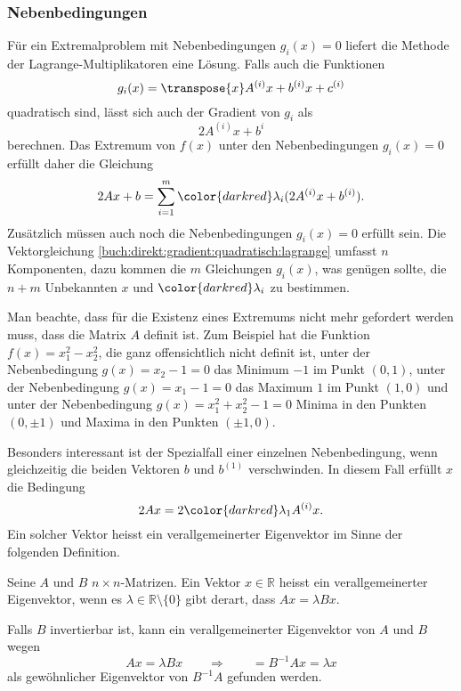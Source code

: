 %
%
\subsubsection{Nebenbedingungen}
Für ein Extremalproblem mit Nebenbedingungen $g_i(x)=0$ liefert die
Methode der Lagrange-Multiplikatoren eine Lösung.
Falls auch die Funktionen
\[
g_i(x)
=
\transpose{x}A^{(i)}x + b^{(i)}x + c^{(i)}
\]
quadratisch sind, lässt sich auch der Gradient von $g_i$ als
\[
2A^{(i)}x + b^{i}
\]
berechnen.
Das Extremum von $f(x)$ unter den Nebenbedingungen $g_i(x)=0$ erfüllt
daher die Gleichung
\begin{equation}
2Ax + b
=
\sum_{i=1}^m {\color{darkred}\lambda_i} (2A^{(i)}x+b^{(i)}).
\label{buch:direkt:gradient:quadratisch:lagrange}
\end{equation}
Zusätzlich müssen auch noch die Nebenbedingungen $g_i(x)=0$ erfüllt sein.
Die Vektorgleichung \eqref{buch:direkt:gradient:quadratisch:lagrange}
umfasst $n$ Komponenten, dazu kommen die $m$ Gleichungen $g_i(x)$,
was genügen sollte, die $n+m$ Unbekannten $x$ und ${\color{darkred}\lambda_i}$
zu bestimmen.

Man beachte, dass für die Existenz eines Extremums nicht mehr gefordert
werden muss, dass die Matrix $A$ definit ist.
Zum Beispiel hat die Funktion $f(x) = x_1^2 - x_2^2$, die ganz offensichtlich
nicht definit ist,
unter der Nebenbedingung $g(x)=x_2-1=0$ das Minimum $-1$ im Punkt $(0,1)$,
unter der Nebenbedingung $g(x)=x_1-1=0$ das Maximum $1$ im Punkt $(1,0)$ und
unter der Nebenbedingung $g(x)=x_1^2+x_2^2-1=0$ Minima in den Punkten
$(0,\pm1)$ und Maxima in den Punkten $(\pm1,0)$.

Besonders interessant ist der Spezialfall einer einzelnen Nebenbedingung,
wenn gleichzeitig die beiden Vektoren $b$ und $b^{(1)}$ verschwinden.
In diesem Fall erfüllt $x$ die Bedingung
\[
2Ax=2{\color{darkred}\lambda_1}A^{(i)}x.
\]
Ein solcher Vektor heisst ein verallgemeinerter Eigenvektor im Sinne
der folgenden Definition.

\begin{definition}
Seine $A$ und $B$ $n\times n$-Matrizen.
Ein Vektor $x\in\mathbb{R}$ heisst ein verallgemeinerter Eigenvektor,
wenn es $\lambda\in\mathbb{R}\setminus \{0\}$ gibt derart, dass
$Ax=\lambda Bx$.
\end{definition}

Falls $B$ invertierbar ist, kann ein verallgemeinerter Eigenvektor von $A$
und $B$ wegen
\[
Ax=\lambda Bx
\qquad\Rightarrow\qquad
=
B^{-1}Ax=\lambda x
\]
als gewöhnlicher Eigenvektor von $B^{-1}A$ gefunden werden.

